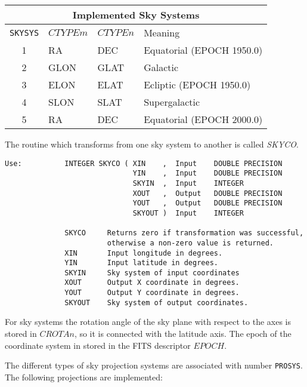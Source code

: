 \begin{center}
\begin{tabular}{|c|l|l|l|}
\hline
\multicolumn{4}{|c|}{Implemented Sky Systems}\\
\hline
{\tt SKYSYS}&$CTYPEm$&$CTYPEn$&Meaning\\
\hline
1&RA  &DEC &Equatorial (EPOCH 1950.0)\\
2&GLON&GLAT&Galactic                 \\
3&ELON&ELAT&Ecliptic   (EPOCH 1950.0)\\
4&SLON&SLAT&Supergalactic            \\
5&RA  &DEC &Equatorial (EPOCH 2000.0)\\
\hline
\end{tabular}
\end{center}

\noindent The routine which transforms from one sky system to another is
called {\sl SKYCO\/}.

\begin{verbatim}
Use:          INTEGER SKYCO ( XIN    ,  Input    DOUBLE PRECISION
                              YIN    ,  Input    DOUBLE PRECISION
                              SKYIN  ,  Input    INTEGER
                              XOUT   ,  Output   DOUBLE PRECISION
                              YOUT   ,  Output   DOUBLE PRECISION
                              SKYOUT )  Input    INTEGER

              SKYCO     Returns zero if transformation was successful,
                        otherwise a non-zero value is returned.
              XIN       Input longitude in degrees.
              YIN       Input latitude in degrees.
              SKYIN     Sky system of input coordinates
              XOUT      Output X coordinate in degrees.
              YOUT      Output Y coordinate in degrees.
              SKYOUT    Sky system of output coordinates.
\end{verbatim}

\noindent For sky systems the rotation angle of the sky plane with
respect to the axes is stored in $CROTAn$, so it is connected with the
latitude axis. The epoch of the coordinate system in stored in the FITS
descriptor $EPOCH$.

The different types of sky projection systems are associated with number
{\tt PROSYS}. The following projections are implemented:

